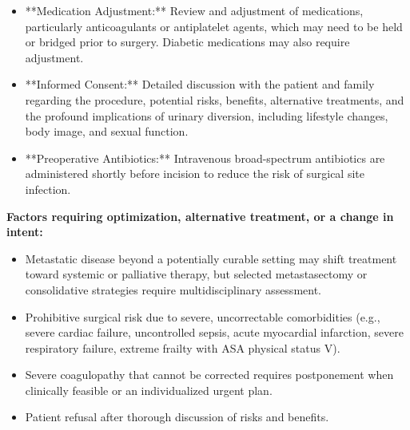 \begin{itemize}
  \item **Medication Adjustment:** Review and adjustment of medications, particularly anticoagulants or antiplatelet agents, which may need to be held or bridged prior to surgery. Diabetic medications may also require adjustment.
  
  \item **Informed Consent:** Detailed discussion with the patient and family regarding the procedure, potential risks, benefits, alternative treatments, and the profound implications of urinary diversion, including lifestyle changes, body image, and sexual function.
  
  \item **Preoperative Antibiotics:** Intravenous broad-spectrum antibiotics are administered shortly before incision to reduce the risk of surgical site infection.
\end{itemize}

\textbf{Factors requiring optimization, alternative treatment, or a change in intent:}
\begin{itemize}
  \item Metastatic disease beyond a potentially curable setting may shift treatment toward systemic or palliative therapy, but selected metastasectomy or consolidative strategies require multidisciplinary assessment.
  
  \item Prohibitive surgical risk due to severe, uncorrectable comorbidities (e.g., severe cardiac failure, uncontrolled sepsis, acute myocardial infarction, severe respiratory failure, extreme frailty with ASA physical status V).
  
  \item Severe coagulopathy that cannot be corrected requires postponement when clinically feasible or an individualized urgent plan.
  
  \item Patient refusal after thorough discussion of risks and benefits.
\end{itemize}


